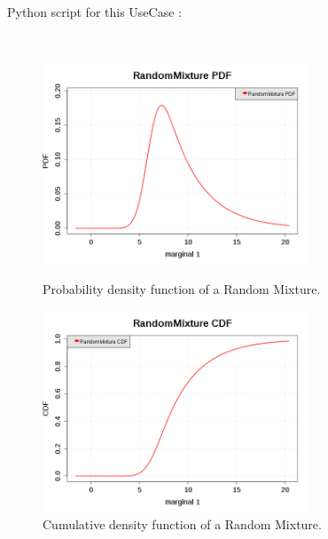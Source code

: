             \textspace\\
             Python script for this UseCase :


             \textspace\\


             \begin{figure}[H]
               \begin{minipage}{8cm}
                 \begin{center}
                   \includegraphics[width=8cm]{Figures/RandomMixture_pdf.png}
                   \caption{Probability density function of a Random Mixture.}
                   \label{PDFRandomMixture}
                 \end{center}
               \end{minipage}
               \hfill
               \begin{minipage}{8cm}
                 \begin{center}
                   \includegraphics[width=8cm]{Figures/RandomMixture_cdf.png}
                   \caption{Cumulative density function of a Random Mixture.}
                   \label{CDFRandomMixture}
                 \end{center}
               \end{minipage}
             \end{figure}
